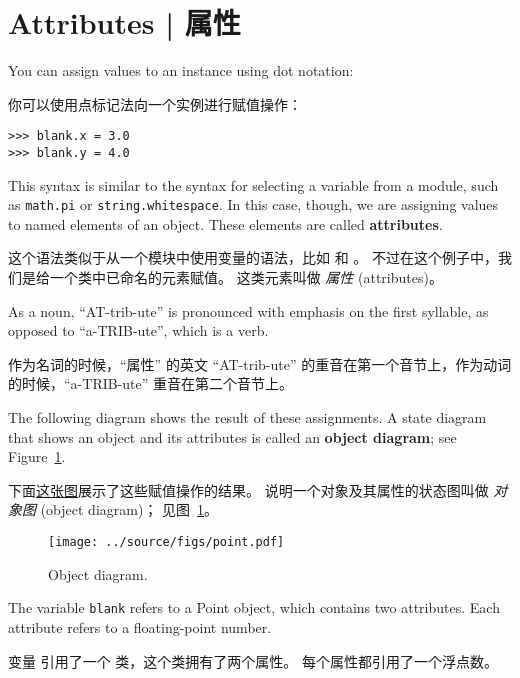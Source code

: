 \section{Attributes  |  属性}
\label{attributes}
  

You can assign values to an instance using dot notation:

你可以使用点标记法向一个实例进行赋值操作：

\begin{lstlisting}
>>> blank.x = 3.0
>>> blank.y = 4.0
\end{lstlisting}
%
This syntax is similar to the syntax for selecting a variable from a
module, such as {\tt math.pi} or {\tt string.whitespace}.  In this case,
though, we are assigning values to named elements of an object.
These elements are called {\bf attributes}.

这个语法类似于从一个模块中使用变量的语法，比如  和  。  不过在这个例子中，我们是给一个类中已命名的元素赋值。  这类元素叫做 {\em 属性} (attributes)。

As a noun, ``AT-trib-ute'' is pronounced with emphasis on the first
syllable, as opposed to ``a-TRIB-ute'', which is a verb.

作为名词的时候，``属性'' 的英文 ``AT-trib-ute'' 的重音在第一个音节上，作为动词的时候，``a-TRIB-ute'' 重音在第二个音节上。

The following diagram shows the result of these assignments.
A state diagram that shows an object and its attributes is
called an {\bf object diagram}; see Figure~\ref{fig.point}.

下面\hyperref[fig.point]{这张图}展示了这些赋值操作的结果。 说明一个对象及其属性的状态图叫做 {\em 对象图} (object diagram)； 见图~\ref{fig.point}。

  
  

\begin{figure}
\centerline
{\texttt{[image: ../source/figs/point.pdf]}}
\caption{Object diagram.}
\label{fig.point}
\end{figure}

The variable {\tt blank} refers to a Point object, which
contains two attributes.  Each attribute refers to a
floating-point number.

变量  引用了一个  类，这个类拥有了两个属性。
每个属性都引用了一个浮点数。


